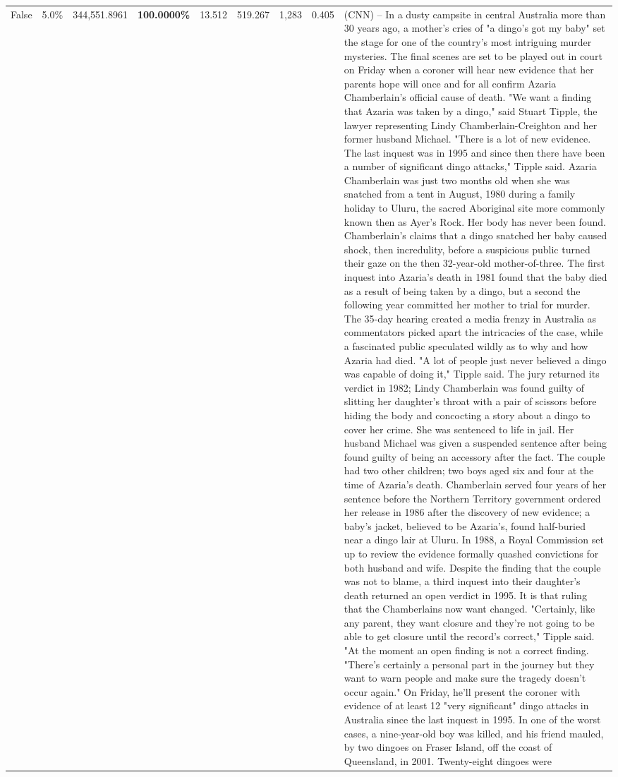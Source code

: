 \begin{table}[H]
\begin{tabular}{lllrlllll}
False & 5.0\% & 344,551.8961 & \bfseries \color{red} 100.0000\% & 13.512 & 519.267 & 1,283 & 0.405 & (CNN) -- In a dusty campsite in central Australia more than 30 years ago, a mother's cries of "a dingo's got my baby" set the stage for one of the country's most intriguing murder mysteries. The final scenes are set to be played out in court on Friday when a coroner will hear new evidence that her parents hope will once and for all confirm Azaria Chamberlain's official cause of death. "We want a finding that Azaria was taken by a dingo," said Stuart Tipple, the lawyer representing Lindy Chamberlain-Creighton and her former husband Michael. "There is a lot of new evidence. The last inquest was in 1995 and since then there have been a number of significant dingo attacks," Tipple said. Azaria Chamberlain was just two months old when she was snatched from a tent in August, 1980 during a family holiday to Uluru, the sacred Aboriginal site more commonly known then as Ayer's Rock. Her body has never been found. Chamberlain's claims that a dingo snatched her baby caused shock, then incredulity, before a suspicious public turned their gaze on the then 32-year-old mother-of-three. The first inquest into Azaria's death in 1981 found that the baby died as a result of being taken by a dingo, but a second the following year committed her mother to trial for murder. The 35-day hearing created a media frenzy in Australia as commentators picked apart the intricacies of the case, while a fascinated public speculated wildly as to why and how Azaria had died. "A lot of people just never believed a dingo was capable of doing it," Tipple said. The jury returned its verdict in 1982; Lindy Chamberlain was found guilty of slitting her daughter's throat with a pair of scissors before hiding the body and concocting a story about a dingo to cover her crime. She was sentenced to life in jail. Her husband Michael was given a suspended sentence after being found guilty of being an accessory after the fact. The couple had two other children; two boys aged six and four at the time of Azaria's death. Chamberlain served four years of her sentence before the Northern Territory government ordered her release in 1986 after the discovery of new evidence; a baby's jacket, believed to be Azaria's, found half-buried near a dingo lair at Uluru. In 1988, a Royal Commission set up to review the evidence formally quashed convictions for both husband and wife. Despite the finding that the couple was not to blame, a third inquest into their daughter's death returned an open verdict in 1995. It is that ruling that the Chamberlains now want changed. "Certainly, like any parent, they want closure and they're not going to be able to get closure until the record's correct," Tipple said. "At the moment an open finding is not a correct finding. "There's certainly a personal part in the journey but they want to warn people and make sure the tragedy doesn't occur again." On Friday, he'll present the coroner with evidence of at least 12 "very significant" dingo attacks in Australia since the last inquest in 1995. In one of the worst cases, a nine-year-old boy was killed, and his friend mauled, by two dingoes on Fraser Island, off the coast of Queensland, in 2001. Twenty-eight dingoes were 
\end{tabular}
\end{table}
